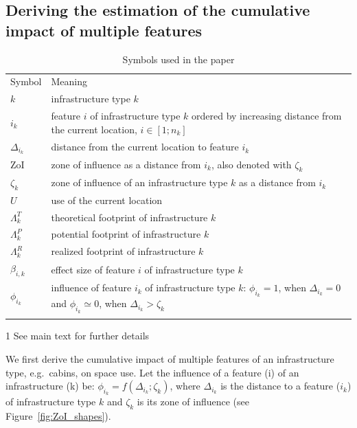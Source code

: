 \documentclass{article}
\begin{document}
\subsection{Deriving the estimation of the cumulative impact of multiple features}

\begin{table}
\caption{Symbols used in the paper}
\label{tab:symbols} %
\begin{threeparttable}
\begin{tabular}{ll}
\hline\noalign{\smallskip}
Symbol & Meaning\tnote{1} \\
\noalign{\smallskip}\hline\noalign{\smallskip}
$k$ & infrastructure type $k$ \\
$i_k$ & feature $i$ of infrastructure type $k$ ordered by increasing distance from the current location, $i \in [1;n_k]$ \\
$\Delta_{i_k}$ & distance from the current location to feature $i_k$ \\
ZoI & zone of influence as a distance from $i_k$, also denoted with $\zeta_k$ \\
$\zeta_k$ & zone of influence of an infrastructure type $k$ as a distance from $i_k$ \\
$U$ & use of the current location\\
$\Lambda^T_k$ & theoretical footprint of infrastructure $k$ \\
$\Lambda^P_k$ & potential footprint of infrastructure $k$  \\
$\Lambda^R_k$ & realized footprint of infrastructure $k$  \\
$\beta_{i,k}$ & effect size of feature $i$ of infrastructure type $k$  \\
$\phi_{i_k}$ & influence of feature $i_k$ of infrastructure type $k$: $\phi_{i_k} = 1$, when $\Delta_{i_k} = 0$ and $\phi_{i_k} \simeq 0$, when $\Delta_{i_k} > \zeta_k$  \\
\noalign{\smallskip}\hline
\end{tabular}
\begin{tablenotes}
\item[1] See main text for further details
\end{tablenotes}
\end{threeparttable}
\end{table}

We first derive the cumulative impact of multiple features of an infrastructure type, e.g.\ cabins, on space use.
Let the influence of a feature (i) of an infrastructure (k) be: $\phi_{i_k} = f(\Delta_{i_k}; \zeta_k)$, where $\Delta_{i_k}$ is the distance to a feature ($i_k$) of infrastructure type $k$ and $\zeta_k$ is its zone of influence (see Figure~\ref{fig:ZoI_shapes}).
\end{document}
